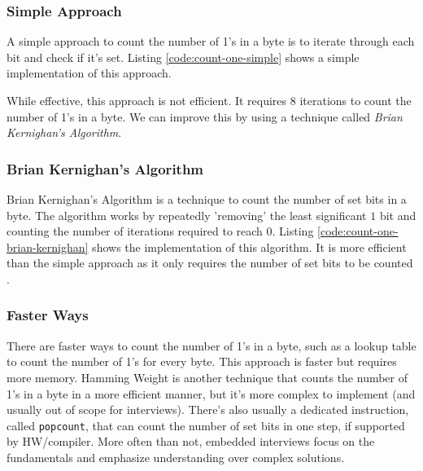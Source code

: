 \documentclass[main.tex]{subfiles}
\begin{document}
\subsubsection{Simple Approach}
A simple approach to count the number of 1's in a byte is to iterate through each bit and check if it's set. Listing \ref{code:count-one-simple} shows a simple implementation of this approach.



\noindent While effective, this approach is not efficient. It requires 8 iterations to count the number of 1's in a byte. We can improve this by using a technique called \textit{Brian Kernighan's Algorithm}.

\subsubsection{Brian Kernighan's Algorithm}
Brian Kernighan's Algorithm is a technique to count the number of set bits in a byte. The algorithm works by repeatedly 'removing' the least significant $1$ bit and counting the number of iterations required to reach 0. Listing \ref{code:count-one-brian-kernighan} shows the implementation of this algorithm. It is more efficient than the simple approach as it only requires the number of set bits to be counted \cite{seander_bithacks}.



\subsubsection{Faster Ways}
There are faster ways to count the number of 1's in a byte, such as a lookup table to count the number of 1's for every byte. This approach is faster but requires more memory. Hamming Weight is another technique that counts the number of 1's in a byte in a more efficient manner, but it's more complex to implement (and usually out of scope for interviews). There's also usually a dedicated instruction, called \texttt{popcount}, that can count the number of set bits in one step, if supported by HW/compiler. More often than not, embedded interviews focus on the fundamentals and emphasize understanding over complex solutions.
\end{document}

